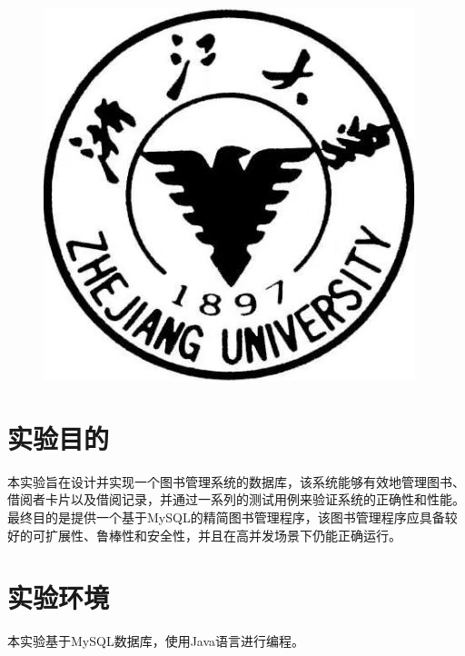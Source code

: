 \documentclass{ctexart}
\begin{document}
\title{\fontsize{35pt}{\baselineskip}\selectfont\linespread{2}}

\date{\huge{\today}}
\author{\large\textbf{叶容宇 3230101885}}
\maketitle

\begin{figure}[ht]
    \centering
    \includegraphics[scale=0.5]{ZJU.jpg}
\end{figure}

\maketitle
\newpage
\tableofcontents
\newpage
\section{实验目的}
本实验旨在设计并实现一个图书管理系统的数据库，该系统能够有效地管理图书、借阅者卡片以及借阅记录，并通过一系列的测试用例来验证系统的正确性和性能。
最终目的是提供一个基于MySQL的精简图书管理程序，该图书管理程序应具备较好的可扩展性、鲁棒性和安全性，并且在高并发场景下仍能正确运行。

\section{实验环境}

本实验基于MySQL数据库，使用Java语言进行编程。
\end{document}
